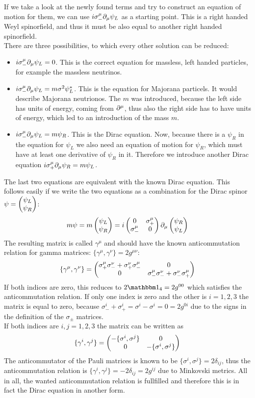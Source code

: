If we take a look at the newly found terms and try to construct an equation of motion for them, we can use $i \sigma_-^\mu\partial_\mu \psi_L$ as a starting point. This is a right handed Weyl spinorfield, and thus it must be also equal to another right handed spinorfield.\\
There are three possibilities, to which every other solution can be reduced:
\begin{itemize}
\item $i \sigma_-^\mu \partial_\mu \psi_L = 0$. This is the correct equation for massless, left handed particles, for example the massless neutrinos.
\item $i \sigma_-^\mu \partial_\mu \psi_L = m \sigma^2 \psi_L^*$. This is the equation for Majorana particels. It would describe Majorana neutrionos. The $m$ was introduced, because the left side has units of energy, coming from $\partial^\mu$, thus also the right side has to have units of energy, which led to an introduction of the mass $m$.
\item $i \sigma_-^\mu \partial_\mu \psi_L = m \psi_R$. This is the Dirac equation. Now, because there is a $\psi_R$ in the equation for $\psi_L$ we also need an equation of motion for $\psi_R$, which must have at least one derivative of $\psi_R$ in it. Therefore we introduce another Dirac equation $i \sigma_+^\mu \partial_\mu \psi_R = m \psi_L$.
\end{itemize}
The last two equations are equivalent with the known Dirac equation. This follows easily if we write the two equations as a combination for the Dirac spinor $\psi = \begin{pmatrix} \psi_L \\ \psi_R \end{pmatrix}$:
\[ m \psi = m \begin{pmatrix} \psi_L \\ \psi_R \end{pmatrix} = i \begin{pmatrix}0&\sigma_+^\mu\\\sigma_-^\mu&0\end{pmatrix} \partial_\mu\begin{pmatrix} \psi_R \\ \psi_L \end{pmatrix}\]
The resulting matrix is called $\gamma^\mu$ and should have the known anticommutation relation for gamma matrices: $\{\gamma^\mu, \gamma^\nu\} = 2g^{\mu\nu}$:
\[\{\gamma^\mu, \gamma^\nu\} = \begin{pmatrix}\sigma_+^\mu\sigma_-^\nu + \sigma_+^\nu\sigma_-^\mu&0\\0&\sigma_-^\mu\sigma_-^\nu+ \sigma_-^\nu\sigma_+^\mu\end{pmatrix}\]
If both indices are zero, this reduces to $2\ehm_4 = 2 g^{00}$ which satisfies the anticommutation relation. If only one index is zero and the other is $i = 1,2,3$ the matrix is equal to zero, because $\sigma_-^i + \sigma_+^i = \sigma^i - \sigma^i = 0 = 2 g^{0i}$ due to the signs in the definition of the $\sigma_\pm$ matrices. \\
If both indices are $i,j = 1,2,3$ the matrix can be written as 
\[ \{\gamma^i,\gamma^j\} = \begin{pmatrix}-\{\sigma^i,\sigma^j\}&0\\0&-\{\sigma^i,\sigma^j\}\end{pmatrix}\]
The anticommutator of the Pauli matrices is known to be $\{\sigma^i, \sigma^j\} = 2\delta_{ij}$, thus the anticommutation relation is $\{\gamma^i,\gamma^j\} = - 2\delta_{ij} = 2 g^{ij}$ due to Minkovski metrics. All in all, the wanted anticommutation relation is fullfilled and therefore this is in fact the Dirac equation in another form.

